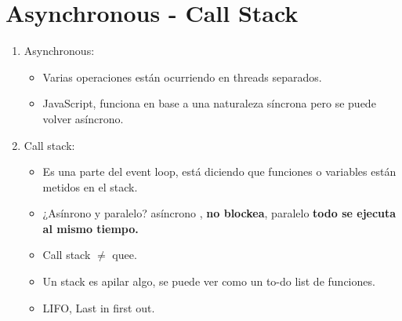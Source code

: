 \section{Asynchronous - Call Stack}
\begin{enumerate}
    \item Asynchronous: 
        \begin{itemize}
            \item Varias operaciones están ocurriendo en threads separados.
            \item JavaScript, funciona en base a una naturaleza síncrona pero se puede volver asíncrono.
        \end{itemize}

    \item Call stack: 
        \begin{itemize}
            \item Es una parte del event loop, está diciendo que funciones o variables están metidos en el stack.
            \item ¿Asínrono y paralelo? asíncrono , \textbf{no blockea}, paralelo \textbf{todo se ejecuta al mismo tiempo.}
            \item Call stack $\neq$ quee.
            \item Un stack es apilar algo, se puede ver como un to-do list de funciones. 
            \item LIFO, Last in first out.
        \end{itemize}
\end{enumerate}

